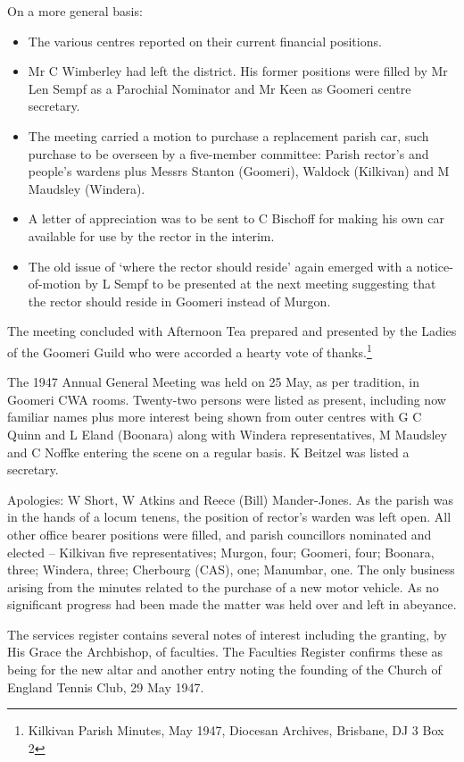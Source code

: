 On a more general basis:

\begin{itemize}
\item
  The various centres reported on their current financial positions.
\item
  Mr C Wimberley had left the district. His former positions were filled by Mr Len Sempf as a Parochial Nominator and Mr Keen as Goomeri centre secretary.
\item
  The meeting carried a motion to purchase a replacement parish car, such purchase to be overseen by a five-member committee: Parish rector's and people's wardens plus Messrs Stanton (Goomeri), Waldock (Kilkivan) and M Maudsley (Windera).
\item
  A letter of appreciation was to be sent to C Bischoff for making his own car available for use by the rector in the interim.
\item
  The old issue of `where the rector should reside' again emerged with a notice-of-motion by L Sempf to be presented at the next meeting suggesting that the rector should reside in Goomeri instead of Murgon.
\end{itemize}

The meeting concluded with Afternoon Tea prepared and presented by the Ladies of the Goomeri Guild who were accorded a hearty vote of thanks.\footnote{Kilkivan Parish Minutes, May 1947, Diocesan Archives, Brisbane, DJ 3 Box 2}

The 1947 Annual General Meeting was held on 25 May, as per tradition, in Goomeri CWA rooms. Twenty-two persons were listed as present, including now familiar names plus more interest being shown from outer centres with G C Quinn and L Eland (Boonara) along with Windera representatives, M Maudsley and C Noffke entering the scene on a regular basis. K Beitzel was listed a secretary.

Apologies: W Short, W Atkins and Reece (Bill) Mander-Jones. As the parish was in the hands of a locum tenens, the position of rector's warden was left open. All other office bearer positions were filled, and parish councillors nominated and elected -- Kilkivan five representatives; Murgon, four; Goomeri, four; Boonara, three; Windera, three; Cherbourg (CAS), one; Manumbar, one. The only business arising from the minutes related to the purchase of a new motor vehicle. As no significant progress had been made the matter was held over and left in abeyance.

The services register contains several notes of interest including the granting, by His Grace the Archbishop, of faculties. The Faculties Register confirms these as being for the new altar and another entry noting the founding of the Church of England Tennis Club, 29 May 1947.

